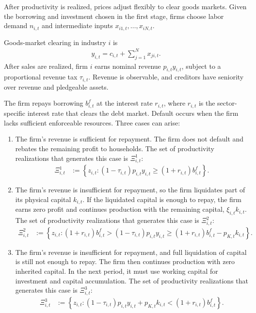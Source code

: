 \documentclass[12pt]{article}
\numberwithin{equation}{section}
\begin{document}
After productivity is realized, prices adjust flexibly to clear goods markets. Given the borrowing and investment chosen in the first stage, firms choose labor demand $n_{i,t}$ and intermediate inputs $x_{i1,t},\ldots,x_{iN,t}$.

Goods-market clearing in industry $i$ is
\begin{align}\label{eq:goods_market_clearing}
    y_{i,t}
    =
    c_{i,t}+\sum_{j=1}^{N}x_{ji,t}.
\end{align}
After sales are realized, firm $i$ earns nominal revenue $p_{i,t} y_{i,t}$, subject to a proportional revenue tax $\tau_{i,t}$. Revenue is observable, and creditors have seniority over revenue and pledgeable assets.

The firm repays borrowing $b^f_{i,t}$ at the interest rate $r_{i,t}$, where $r_{i,t}$ is the sector-specific interest rate that clears the debt market. Default occurs when the firm lacks sufficient enforceable resources. Three cases can arise:
\begin{enumerate}
    \item The firm's revenue is sufficient for repayment. The firm does not default and rebates the remaining profit to households. The set of productivity realizations that generates this case is $\Xi^1_{i,t}$:
    \begin{align*}
        \Xi^1_{i,t} &:= \left\{z_{i,t}: (1-\tau_{i,t})p_{i,t} y_{i,t} \geq (1+r_{i,t})b^f_{i,t}\right\}.
    \end{align*}
    \item The firm's revenue is insufficient for repayment, so the firm liquidates part of its physical capital $k_{i,t}$. If the liquidated capital is enough to repay, the firm earns zero profit and continues production with the remaining capital, $\xi_{i,t} k_{i,t}$. The set of productivity realizations that generates this case is $\Xi^2_{i,t}$:
    \begin{align*}
        \Xi^2_{i,t} &:= \left\{z_{i,t}: (1+r_{i,t})b^f_{i,t} > (1-\tau_{i,t})p_{i,t} y_{i,t} \geq (1+r_{i,t})b^f_{i,t} - p_{K,t} k_{i,t}\right\}.
    \end{align*}
    \item The firm's revenue is insufficient for repayment, and full liquidation of capital is still not enough to repay. The firm then continues production with zero inherited capital. In the next period, it must use working capital for investment and capital accumulation. The set of productivity realizations that generates this case is $\Xi^3_{i,t}$:
    \begin{align*}
        \Xi^3_{i,t} &:= \left\{z_{i,t}: (1-\tau_{i,t})p_{i,t} y_{i,t} + p_{K,t} k_{i,t} < (1+r_{i,t})b^f_{i,t}\right\}.
    \end{align*}
\end{enumerate}
\end{document}

